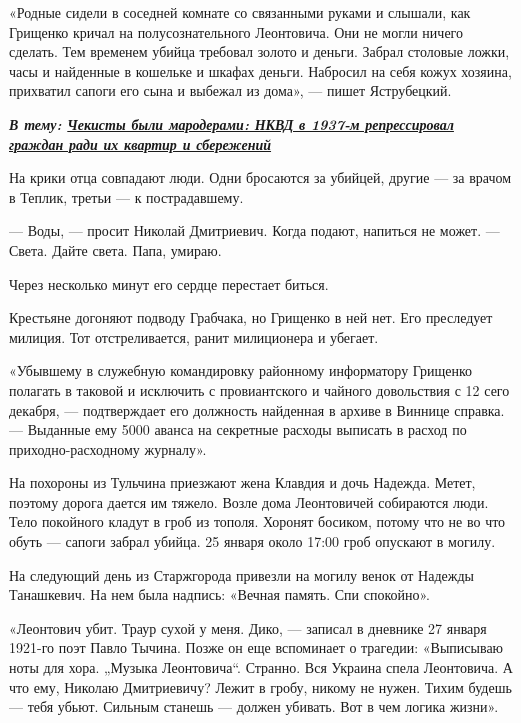 «Родные сидели в соседней комнате со связанными руками и слышали, как Грищенко
кричал на полусознательного Леонтовича. Они не могли ничего сделать. Тем
временем убийца требовал золото и деньги. Забрал столовые ложки, часы и
найденные в кошельке и шкафах деньги. Набросил на себя кожух хозяина, прихватил
сапоги его сына и выбежал из дома», — пишет Яструбецкий.

\begin{leftbar}
  \begingroup
    \em\Large\bfseries\color{blue}
				В тему: \href{http://argumentua.com/stati/chekisty-byli-maroderami-nkvd-v-1937-m-repressiroval-grazhdan-radi-ikh-kvartir-i-sberezhenii}{Чекисты были мародерами: НКВД в 1937-м репрессировал граждан ради их квартир и сбережений}
  \endgroup
\end{leftbar}

На крики отца совпадают люди. Одни бросаются за убийцей, другие — за врачом в
Теплик, третьи — к пострадавшему.

— Воды, — просит Николай Дмитриевич. Когда подают, напиться не может. — Света.
Дайте света. Папа, умираю.

Через несколько минут его сердце перестает биться.

Крестьяне догоняют подводу Грабчака, но Грищенко в ней нет. Его преследует
милиция. Тот отстреливается, ранит милиционера и убегает.

«Убывшему в служебную командировку районному информатору Грищенко полагать в
таковой и исключить с провиантского и чайного довольствия с 12 сего декабря, —
подтверждает его должность найденная в архиве в Виннице справка. — Выданные ему
5000 аванса на секретные расходы выписать в расход по приходно-расходному
журналу».

На похороны из Тульчина приезжают жена Клавдия и дочь Надежда. Метет, поэтому
дорога дается им тяжело. Возле дома Леонтовичей собираются люди. Тело покойного
кладут в гроб из тополя. Хоронят босиком, потому что не во что обуть — сапоги
забрал убийца. 25 января около 17:00 гроб опускают в могилу.

На следующий день из Старжгорода привезли на могилу венок от Надежды
Танашкевич. На нем была надпись: «Вечная память. Спи спокойно».

«Леонтович убит. Траур сухой у меня. Дико, — записал в дневнике 27 января
1921-го поэт Павло Тычина. Позже он еще вспоминает о трагедии: «Выписываю ноты
для хора. „Музыка Леонтовича“. Странно. Вся Украина спела Леонтовича. А что
ему, Николаю Дмитриевичу? Лежит в гробу, никому не нужен. Тихим будешь — тебя
убьют. Сильным станешь — должен убивать. Вот в чем логика жизни».

